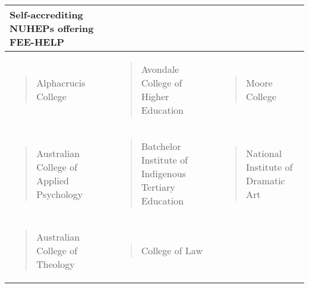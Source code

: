 \documentclass[]{book}
\begin{document}
\begin{longtable}[]{@{}lll@{}}
\toprule
\textbf{Self-accrediting NUHEPs offering FEE-HELP}\tabularnewline
\midrule
\endhead
\begin{minipage}[t]{0.32\columnwidth}\raggedright
\begin{quote}
Alphacrucis College
\end{quote}\strut
\end{minipage} & \begin{minipage}[t]{0.32\columnwidth}\raggedright
\begin{quote}
Avondale College of Higher Education
\end{quote}\strut
\end{minipage} & \begin{minipage}[t]{0.32\columnwidth}\raggedright
\begin{quote}
Moore College
\end{quote}\strut
\end{minipage}\tabularnewline
\begin{minipage}[t]{0.32\columnwidth}\raggedright
\begin{quote}
Australian College of Applied Psychology
\end{quote}\strut
\end{minipage} & \begin{minipage}[t]{0.32\columnwidth}\raggedright
\begin{quote}
Batchelor Institute of Indigenous Tertiary Education
\end{quote}\strut
\end{minipage} & \begin{minipage}[t]{0.32\columnwidth}\raggedright
\begin{quote}
National Institute of Dramatic Art
\end{quote}\strut
\end{minipage}\tabularnewline
\begin{minipage}[t]{0.32\columnwidth}\raggedright
\begin{quote}
Australian College of Theology
\end{quote}\strut
\end{minipage} & \begin{minipage}[t]{0.32\columnwidth}\raggedright
\begin{quote}
College of Law
\end{quote}\strut
\end{minipage} & \begin{minipage}[t]{0.32\columnwidth}\raggedright
\begin{quote}

\end{quote}
\end{minipage}
\end{longtable}
\end{document}
